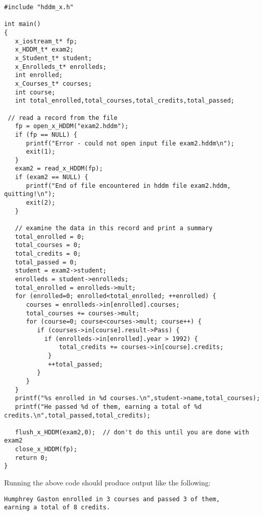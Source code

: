 \documentclass{revtex4}
\begin{document}
\vspace{0.5cm}
\begin{minipage}{12cm}
\begin{verbatim}
#include "hddm_x.h"

int main()
{
   x_iostream_t* fp;
   x_HDDM_t* exam2;
   x_Student_t* student;
   x_Enrolleds_t* enrolleds;
   int enrolled;
   x_Courses_t* courses;
   int course;
   int total_enrolled,total_courses,total_credits,total_passed;

 // read a record from the file
   fp = open_x_HDDM("exam2.hddm");
   if (fp == NULL) {
	  printf("Error - could not open input file exam2.hddm\n");
	  exit(1);
   }
   exam2 = read_x_HDDM(fp);
   if (exam2 == NULL) {
	  printf("End of file encountered in hddm file exam2.hddm, quitting!\n");
	  exit(2);
   }

   // examine the data in this record and print a summary
   total_enrolled = 0;
   total_courses = 0;
   total_credits = 0;
   total_passed = 0;
   student = exam2->student;
   enrolleds = student->enrolleds;
   total_enrolled = enrolleds->mult;
   for (enrolled=0; enrolled<total_enrolled; ++enrolled) {
	  courses = enrolleds->in[enrolled].courses;
	  total_courses += courses->mult;
	  for (course=0; course<courses->mult; course++) {
	     if (courses->in[course].result->Pass) {
 	       if (enrolleds->in[enrolled].year > 1992) {
	           total_credits += courses->in[course].credits;
	        }
	        ++total_passed;
	     }
	  }
   }
   printf("%s enrolled in %d courses.\n",student->name,total_courses);
   printf("He passed %d of them, earning a total of %d credits.\n",total_passed,total_credits);

   flush_x_HDDM(exam2,0);  // don't do this until you are done with exam2
   close_x_HDDM(fp);
   return 0;
}
\end{verbatim}
\end{minipage}
\vspace{0.5cm}

Running the above code should produce output like the following:

\vspace{0.5cm}
\begin{minipage}{12cm}
\begin{verbatim}
Humphrey Gaston enrolled in 3 courses and passed 3 of them,
earning a total of 8 credits.
\end{verbatim}
\end{minipage}
\vspace{0.5cm}
\end{document}

